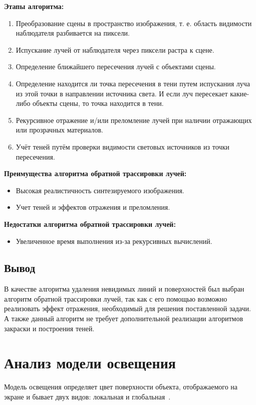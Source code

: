 \textbf{Этапы алгоритма:}
\begin{enumerate}[label=\arabic*)]
	\item Преобразование сцены в пространство изображения, т. е. область видимости наблюдателя разбивается на пиксели.
	\item Испускание лучей от наблюдателя через пиксели растра к сцене.
	\item Определение ближайшего пересечения лучей с объектами сцены.
	\item Определение находится ли точка пересечения в тени путем испускания луча из этой точки в направлении источника света. И если луч пересекает какие-либо объекты сцены, то точка находится в тени.
	\item Рекурсивное отражение и/или преломление лучей при наличии отражающих или прозрачных материалов.
	\item Учёт теней путём проверки видимости световых источников из точки пересечения.
\end{enumerate}

\textbf{Преимущества алгоритма обратной трассировки лучей:}
\begin{itemize}
	\item Высокая реалистичность синтезируемого изображения.
	\item Учет теней и эффектов отражения и преломления.
\end{itemize}

\textbf{Недостатки алгоритма обратной трассировки лучей:}
\begin{itemize}
	\item Увеличенное время выполнения из-за рекурсивных вычислений.
\end{itemize}

\subsection*{Вывод}
В качестве алгоритма удаления невидимых линий и поверхностей был выбран алгоритм обратной трассировки лучей, так как с его помощью возможно реализовать эффект отражения, необходимый для решения поставленной задачи. А также данный алгоритм не требует дополнительной реализации алгоритмов закраски и построения теней.

\clearpage
\section{Анализ модели освещения}
Модель освещения определяет цвет поверхности объекта, отображаемого на экране и бывает двух видов: локальная и глобальная~\cite{rodgersCG}. 

